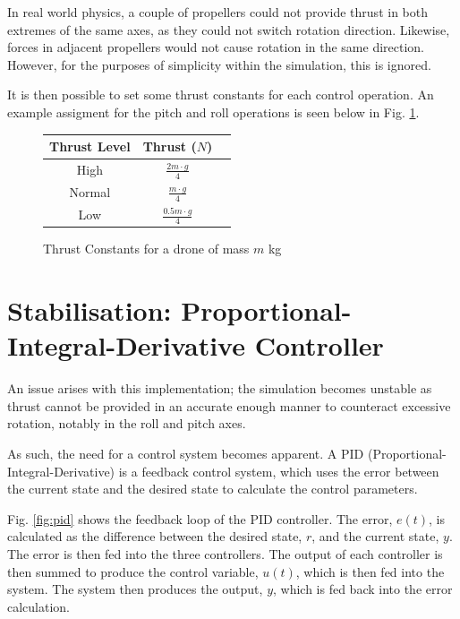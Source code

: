 \documentclass{article}
\begin{document}
In real world physics, a couple of propellers could not provide thrust in both extremes of the same axes, as they could not switch rotation direction. Likewise, forces in adjacent propellers would not cause rotation in the same direction. However, for the purposes of simplicity within the simulation, this is ignored.

It is then possible to set some thrust constants for each control operation. An example assigment for the pitch and roll operations is seen below in Fig. \ref{fig:thrust-constants}.

\begin{figure}[H]
    \begin{center}
    \begin{tabular}{| c | c | c |} 
    \hline
    Thrust Level & Thrust ($N$) \\ 
    \hline
    High & $\frac{2m \cdot g}{4}$\\
    \hline
    Normal & $\frac{m \cdot g}{4}$\\
    \hline
    Low & $\frac{0.5m \cdot g}{4}$\\
    \hline
    \end{tabular}
    \end{center}
    \caption{Thrust Constants for a drone of mass $m$ kg}
    \label{fig:thrust-constants}
\end{figure}

\section{Stabilisation: Proportional-Integral-Derivative Controller}
\label{sec:stabilisation}

An issue arises with this implementation; the simulation becomes unstable as thrust cannot be provided in an accurate enough manner to counteract excessive rotation, notably in the roll and pitch axes. 

As such, the need for a control system becomes apparent. A PID (Proportional-Integral-Derivative) is a feedback control system, which uses the error between the current state and the desired state to calculate the control parameters.

Fig. \ref{fig:pid} shows the feedback loop of the PID controller. The error, $e(t)$, is calculated as the difference between the desired state, $r$, and the current state, $y$. The error is then fed into the three controllers. The output of each controller is then summed to produce the control variable, $u(t)$, which is then fed into the system. The system then produces the output, $y$, which is fed back into the error calculation.
\end{document}
